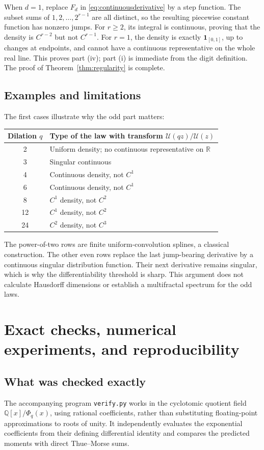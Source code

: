 \documentclass[11pt,letterpaper]{article}
\numberwithin{equation}{section}
\theoremstyle{definition}
\theoremstyle{remark}
\newcommand{\R}{\mathbb R}
\newcommand{\Q}{\mathbb Q}
\newcommand{\Up}{\mathcal U}
\begin{document}
When \(d=1\), replace \(F_d\) in \eqref{eq:continuousderivative} by a step function. The subset sums of \(1,2,\ldots,2^{r-1}\) are all distinct, so the resulting piecewise constant function has nonzero jumps. For \(r\geq2\), its integral is continuous, proving that the density is \(C^{r-2}\) but not \(C^{r-1}\). For \(r=1\), the density is exactly \(\mathbf1_{[0,1]}\), up to changes at endpoints, and cannot have a continuous representative on the whole real line. This proves part (iv); part (i) is immediate from the digit definition. The proof of Theorem~\ref{thm:regularity} is complete.

\subsection{Examples and limitations}
The first cases illustrate why the odd part matters:
\begin{center}
\begin{tabular}{cl}
\toprule
Dilation \(q\)&Type of the law with transform \(\Up(qz)/\Up(z)\)\\
\midrule
2&Uniform density; no continuous representative on \(\R\)\\
3&Singular continuous\\
4&Continuous density, not \(C^1\)\\
6&Continuous density, not \(C^1\)\\
8&\(C^1\) density, not \(C^2\)\\
12&\(C^1\) density, not \(C^2\)\\
24&\(C^2\) density, not \(C^3\)\\
\bottomrule
\end{tabular}
\end{center}
The power-of-two rows are finite uniform-convolution splines, a classical construction. The other even rows replace the last jump-bearing derivative by a continuous singular distribution function. Their next derivative remains singular, which is why the differentiability threshold is sharp. This argument does not calculate Hausdorff dimensions or establish a multifractal spectrum for the odd laws.

\section{Exact checks, numerical experiments, and reproducibility}
\label{sec:checks}

\subsection{What was checked exactly}
The accompanying program \texttt{verify.py} works in the cyclotomic quotient field \(\Q[x]/\Phi_q(x)\), using rational coefficients, rather than substituting floating-point approximations to roots of unity. It independently evaluates the exponential coefficients from their defining differential identity and compares the predicted moments with direct Thue--Morse sums.
\end{document}
